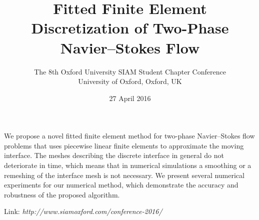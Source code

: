 \documentclass{article}
\begin{document}
\title{Fitted Finite Element Discretization of Two-Phase Navier--Stokes Flow}
\date{27 April 2016}
\author{The 8th Oxford University SIAM Student Chapter Conference\\
University of Oxford, Oxford, UK}

\maketitle

We propose a novel fitted finite element method for two-phase Navier--Stokes
flow problems that uses piecewise linear finite elements to approximate the
moving interface. The meshes describing the discrete interface in general do not
deteriorate in time, which means that in numerical simulations a smoothing or a
remeshing of the interface mesh is not necessary. We present several numerical
experiments for our numerical method, which demonstrate the accuracy and
robustness of the proposed algorithm.

Link: \emph{http://www.siamoxford.com/conference-2016/}
\end{document}
